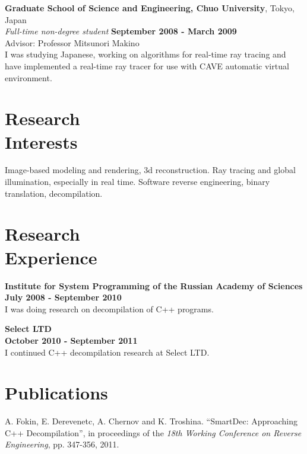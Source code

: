 \documentclass[margin,line]{CV}
\begin{document}
\begin{resume}
    \textbf{Graduate School of Science and Engineering, Chuo University}, Tokyo, Japan \vspace{2mm}\\\vspace{1mm}%
    \textsl{Full-time non-degree student} \hfill \textbf{September 2008 - March 2009}\vspace{1mm}\\
    Advisor: Professor Mitsunori Makino \\
	I was studying Japanese, working on algorithms for real-time ray tracing and have implemented a real-time ray tracer for use with CAVE automatic virtual environment.

    \section{\mysidestyle Research\\Interests}
    Image-based modeling and rendering, 3d reconstruction.
    Ray tracing and global illumination, especially in real time.
    Software reverse engineering, binary translation, decompilation.

    \section{\mysidestyle Research\\Experience}
    \textbf{Institute for System Programming of the Russian Academy of Sciences} \vspace{2mm}\\\vspace{1mm}%
    \hfill \textbf{July 2008 - September 2010}\\
    I was doing research on decompilation of C++ programs.

    \textbf{Select LTD} \vspace{2mm}\\\vspace{1mm}%
    \hfill \textbf{October 2010 - September 2011}\\
    I continued C++ decompilation research at Select LTD.

    \section{\mysidestyle Publications}
    A. Fokin, E. Derevenetc, A. Chernov and K. Troshina. ``SmartDec: Approaching C++ Decompilation'',
	in proceedings of the \textsl{18th Working Conference on Reverse Engineering}, pp. 347-356, 2011.
	

\end{resume}
\end{document}
